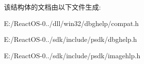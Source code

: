 该结构体的文档由以下文件生成\+:\begin{DoxyCompactItemize}
\item 
E\+:/\+React\+O\+S-\/0../dll/win32/dbghelp/compat.\+h\item 
E\+:/\+React\+O\+S-\/0../sdk/include/psdk/dbghelp.\+h\item 
E\+:/\+React\+O\+S-\/0../sdk/include/psdk/imagehlp.\+h\end{DoxyCompactItemize}
